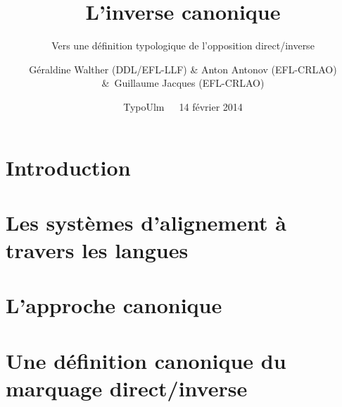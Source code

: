 \documentclass[utf8x]{beamer}
\title[Marquage canonique du direct/inverse]{L'inverse canonique}
\subtitle{Vers une définition typologique de l'opposition direct/inverse}
\author[Walther/Antonov/Jacques]{G\'eraldine Walther (DDL/EFL-LLF) \&
  Anton Antonov (EFL-CRLAO) \&~Guillaume
Jacques (EFL-CRLAO)}
\institute[EFL/CRLAO/LLF/DDL]{Empirical Foundations of
  Linguistics (EFL)\\%
~\\
\url{geraldine.walther@univ-lyon2.fr}\\
\url{a.antonov@gmail.com}\\
\url{rgyalrongskad@gmail.com}
}%
\date[TypoUlm 14/02/2014]{TypoUlm~~~14 février 2014}
\begin{document}
\begin{frame}[noframenumbering]
  \titlepage
\end{frame}


\section*{Introduction}
%


\section[Alignement]{Les systèmes d'alignement à travers les langues}






\section{L'approche canonique}


\section{Une définition canonique du marquage direct/inverse}

\end{document}
